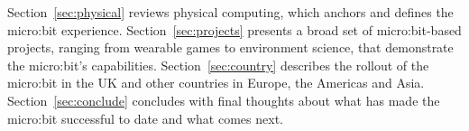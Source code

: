 Section~\ref{sec:physical} reviews physical computing, which anchors 
and defines the micro:bit experience. Section~\ref{sec:projects}
presents a broad set of micro:bit-based projects, ranging
from wearable games to environment science, that demonstrate
the micro:bit's capabilities.  Section~\ref{sec:country}
describes the rollout of the micro:bit in the UK and other countries
in Europe, the Americas and Asia. Section~\ref{sec:conclude}
concludes with final thoughts about what has made the micro:bit
successful to date and what comes next. 














